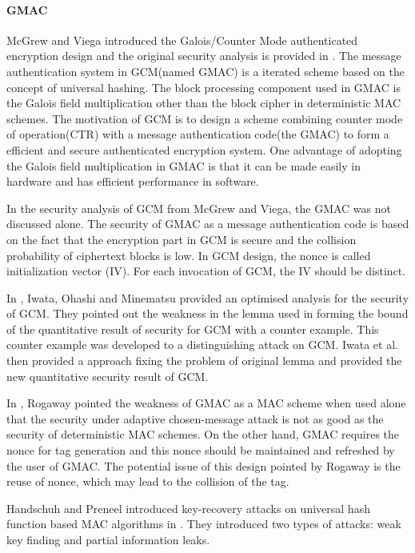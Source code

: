 \documentclass{article}
\begin{document}
\paragraph{GMAC}
McGrew and Viega introduced the Galois/Counter Mode authenticated encryption design and the original security analysis is provided in \cite{gcm}. The message authentication system in GCM(named GMAC) is a iterated scheme based on the concept of universal hashing. The block processing component used in GMAC is the Galois field multiplication other than the block cipher in deterministic MAC schemes. 
The motivation of GCM is to design a scheme combining counter mode of operation(CTR) with a message authentication code(the GMAC) to form a efficient and secure authenticated encryption system.
One advantage of adopting the Galois field multiplication in GMAC is that it can be made easily in hardware and has efficient performance in software. 

In the security analysis of GCM from McGrew and Viega, the GMAC was not discussed alone. The security of GMAC as a message authentication code is based on the fact that the encryption part in GCM is secure and the collision probability of ciphertext blocks is low. 
In GCM design, the nonce is called initialization vector (IV). For each invocation of GCM, the IV should be distinct.

In \cite{breaking}, Iwata, Ohashi and Minematsu provided an optimised analysis for the security of GCM. They pointed out the weakness in the lemma used in forming the bound of the quantitative result of security for GCM with a counter example. This counter example was developed to a distinguishing attack on GCM. Iwata et al. then provided a approach fixing the problem of original lemma and provided the new quantitative security result of GCM. 

In \cite{Rogaway2011}, Rogaway pointed the weakness of GMAC as a MAC scheme when used alone that the security under adaptive chosen-message attack is not as good as the security of deterministic MAC schemes. On the other hand, GMAC requires the nonce for tag generation and this nonce should be maintained and refreshed by the user of GMAC. The potential issue of this design pointed by Rogaway is the reuse of nonce, which may lead to the collision of the tag. 

Handschuh and Preneel introduced key-recovery attacks on universal hash function based MAC algorithms in \cite{key_recover}. They introduced two types of attacks: weak key finding and partial information leaks.
\end{document}
